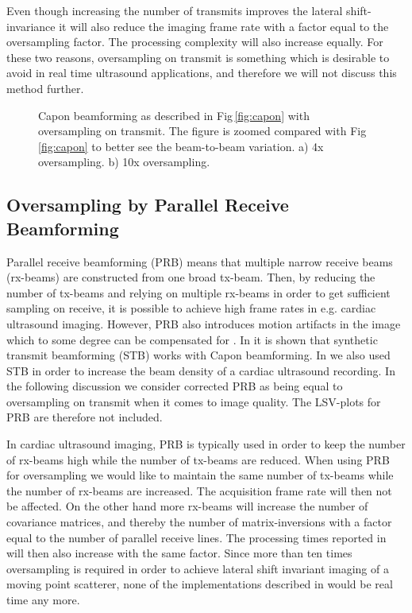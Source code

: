\documentclass[journal]{IEEEtran}
\newcommand{\img}{img/}
\begin{document}
Even though increasing the number of transmits improves the lateral shift-invariance it will also reduce the imaging frame rate with a factor equal to the oversampling factor. The processing complexity will also increase equally. For these two reasons, oversampling on transmit is something which is desirable to avoid in real time ultrasound applications, and therefore we will not discuss this method further.

\begin{figure}[!t]
\centerline{
}
\caption{Capon beamforming as described in Fig\,\ref{fig:capon} with oversampling on transmit. The figure is zoomed compared with Fig\,\ref{fig:capon} to better see the beam-to-beam variation. a) 4x oversampling. b) 10x oversampling.}
\label{fig:capon_oversampling}
\end{figure}

\subsection{Oversampling by Parallel Receive Beamforming}
Parallel receive beamforming (PRB) means that multiple narrow receive beams (rx-beams) are constructed from one broad tx-beam. Then, by reducing the number of tx-beams and relying on multiple rx-beams in order to get sufficient sampling on receive, it is possible to achieve high frame rates in e.g. cardiac ultrasound imaging. However, PRB also introduces motion artifacts in the image which to some degree can be compensated for \cite{Hergum2007, Denarie2011, Denarie2013}. In \cite{Rabinovich2013} it is shown that synthetic transmit beamforming (STB) \cite{Hergum2007} works with Capon beamforming. In \cite{Asen} we also used STB in order to increase the beam density of a cardiac ultrasound recording. In the following discussion we consider corrected PRB as being equal to oversampling on transmit when it comes to image quality. The LSV-plots for PRB are therefore not included.

In cardiac ultrasound imaging, PRB is typically used in order to keep the number of rx-beams high while the number of tx-beams are reduced. When using PRB for oversampling we would like to maintain the same number of tx-beams while the number of rx-beams are increased. The acquisition frame rate will then not be affected. On the other hand more rx-beams will increase the number of covariance matrices, and thereby the number of matrix-inversions with a factor equal to the number of parallel receive lines. The processing times reported in \cite{Asen} will then also increase with the same factor. Since more than ten times oversampling is required in order to achieve lateral shift invariant imaging of a moving point scatterer, none of the implementations described in \cite{Asen} would be real time any more.
\end{document}
